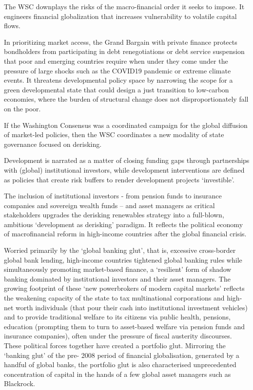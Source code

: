 \documentclass[
]{book}
\begin{document}
The WSC downplays the risks of the macro-financial order it seeks to impose. It
engineers financial globalization that increases vulnerability to volatile capital flows.

In prioritizing market access, the Grand Bargain with private finance
protects bondholders from participating in debt renegotiations or debt service
suspension that poor and emerging countries require when under they come under the
pressure of large shocks such as the COVID19 pandemic or extreme climate events.
It threatens developmental policy space by narrowing the
scope for a green developmental state that could design a just transition to low-carbon
economies, where the burden of structural change does not disproportionately fall on
the poor.

If the Washington Consensus was a coordinated campaign for the global diffusion of
market-led policies, then the WSC coordinates a new modality of state governance
focused on derisking.

Development is narrated as a matter of closing funding gaps
through partnerships with (global) institutional investors,
while development interventions are defined as policies that
create risk buffers to render development projects `investible'.

The inclusion of institutional investors - from pension funds to insurance companies
and sovereign wealth funds -- and asset managers as critical stakeholders upgrades the
derisking renewables strategy into a full-blown, ambitious `development as derisking'
paradigm.
It reflects the political economy of macrofinancial reform in high-income countries
after the global financial crisis.

Worried primarily
by the `global banking glut', that is, excessive cross-border global bank
lending, high-income countries tightened global banking rules while simultaneously
promoting market-based finance, a `resilient' form of shadow banking dominated by
institutional investors and their asset managers. The growing footprint of these `new
powerbrokers of modern capital markets'
reflects the weakening capacity of the state to tax multinational corporations and high-
net worth individuals (that pour their cash into institutional investment vehicles) and to
provide traditional welfare to its citizens via public health, pensions, education
(prompting them to turn to asset-based welfare via pension funds and insurance
companies), often under the pressure of fiscal austerity discourses. These political
forces together have created a portfolio glut. Mirroring the `banking glut' of the pre-
2008 period of financial globalisation, generated by a handful of global banks, the
portfolio glut is also characterised unprecedented concentration of capital in the hands
of a few global asset managers such as Blackrock.
\end{document}
